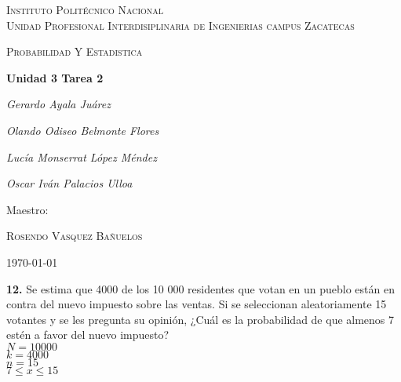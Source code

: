 \documentclass[12pt, letterpaper]{article}
\begin{document}
    \begin{titlepage}
        \centering
        {\scshape\LARGE Instituto Politécnico Nacional\\ Unidad Profesional Interdisiplinaria de Ingenierias campus Zacatecas\par}
        \vspace{1cm}
        {\scshape\Large Probabilidad Y Estadistica\par}
        \vspace{1.5cm}
        {\huge\bfseries Unidad 3 Tarea 2\par}
        \vspace{2cm}
        {\Large\itshape Gerardo Ayala Juárez\par}
        {\Large\itshape Olando Odiseo Belmonte Flores\par}
        {\Large\itshape Lucía Monserrat López Méndez\par}
        {\Large\itshape Oscar Iván Palacios Ulloa\par}
        \vfill
        Maestro:\par
        \textsc{
        Rosendo Vasquez Bañuelos}
        \vfill
        {\large \today \par}
    \end{titlepage}
    \textbf{12.} Se estima que 4000 de los 10 000 residentes que votan en un pueblo est\'an en contra del nuevo impuesto sobre las ventas. Si se seleccionan aleatoriamente 15 votantes y se les pregunta su opini\'on, ¿Cu\'al es la probabilidad de que almenos 7 est\'en a favor del nuevo impuesto?\\
    $N=10000$\\
    $k=4000$\\
    $n=15$\\
    $7\leq x \leq 15$\\
\end{document}
